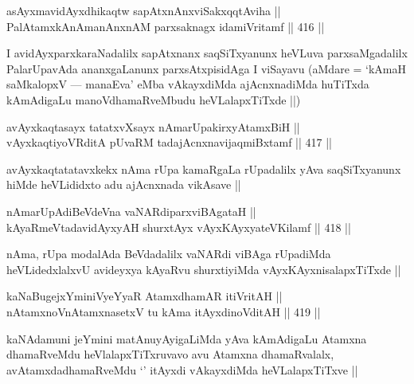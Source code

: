 \begin{shl}
asAyxmavidAyxdhikaqtw sapAtxnAnxviSakxqqtAviha || \\
PalAtamxkAnAmanAnxnAM parxsaknagx idamiVritamf ||  416 ||  
\end{shl}

\begin{artha}
I avidAyxparxkaraNadalilx sapAtxnanx saqSiTxyanunx heVLuva
parxsaMgadalilx PalarUpavAda ananxgaLanunx parxsAtxpisidAga I viSayavu
(aMdare = `kAmaH saMkalopxV --- manaEva' eMba vAkayxdiMda
ajAcnxnadiMda huTiTxda kAmAdigaLu manoVdhamaRveMbudu heVLalapxTiTxde ||)
\end{artha}


\begin{shl}
avAyxkaqtasayx tatatxvXsayx nAmarUpakirxyAtamxBiH || \\
vAyxkaqtiyoVRditA pUvaRM tadajAcnxnavijaqmiBxtamf ||  417 ||  
\end{shl}

\begin{artha}
avAyxkaqtatatavxkekx nAma rUpa kamaRgaLa rUpadalilx yAva saqSiTxyanunx
hiMde heVLididxto adu ajAcnxnada vikAsave ||
\end{artha}


\begin{shl}
nAmarUpAdiBeVdeVna vaNARdiparxviBAgataH || \\
kAyaRmeVtadavidAyxyAH shurxtAyx vAyxKAyxyateV\s Kilamf ||  418 ||  
\end{shl}

\begin{artha}
nAma, rUpa modalAda BeVdadalilx vaNARdi viBAga rUpadiMda
heVLidedxlalxvU avideyxya kAyaRvu shurxtiyiMda vAyxKAyxnisalapxTiTxde ||
\end{artha}


\begin{shl}
kaNaBugejxYminiVyeYyaR AtamxdhamAR itiVritAH || \\
nA\s \s tamxnoV\s nAtamxnasetxV tu kAma itAyxdinoVditAH ||  419 || 
\end{shl}

\begin{artha}
kaNAdamuni jeYmini matAnuyAyigaLiMda yAva kAmAdigaLu Atamxna
dhamaRveMdu heVlalapxTiTxruvavo avu Atamxna dhamaRvalalx,
avAtamxdadhamaRveMdu `\stext' itAyxdi vAkayxdiMda heVLalapxTiTxve ||
\end{artha}

